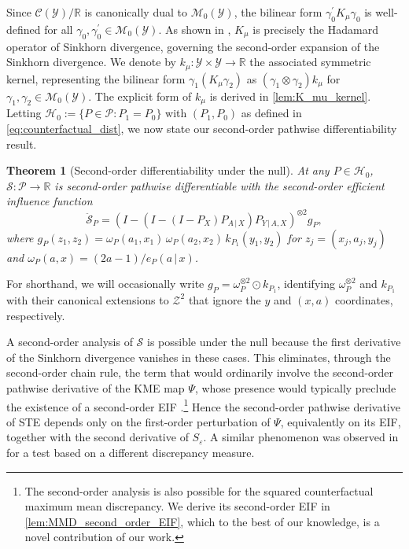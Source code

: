 \documentclass{article}
\theoremstyle{plain}
\newtheorem{theorem}{Theorem}[section]
\theoremstyle{definition}
\theoremstyle{remark}
\newcommand{\R}{\mathbb{R}}
\newcommand{\of}[1]{\left(#1\right)}
\newcommand{\cZ}{\mathcal{Z}}
\newcommand{\cP}{\mathcal{P}}
\newcommand{\cC}{\mathcal{C}}
\newcommand{\cM}{\mathcal{M}}
\newcommand{\cY}{\mathcal{Y}}
\newcommand{\ucH}{\mathscr{H}}
\newcommand{\1}{\mathbbm{1}}
\newcommand{\STE}{\mathscr{S}}
\newcommand{\eps}{\varepsilon}
\theoremstyle{plain}
\theoremstyle{definition}
\newcommand{\mymid}{\,|\,}
\begin{document}
Since $\cC(\cY) / \R$ is canonically dual to $\cM_0(\cY)$, the bilinear form $\gamma_0^\prime K_\mu \gamma_0 $ is well-defined for all $\gamma_0, \gamma_0^\prime \in \cM_0(\cY)$. As shown in \citet{kokot2025coreset}, $K_\mu$ is precisely the Hadamard operator of Sinkhorn divergence, governing the second-order expansion of the Sinkhorn divergence. We denote by $k_\mu: \cY \times \cY \to \R$ the associated symmetric kernel, representing the bilinear form $\gamma_1 (K_\mu \gamma_2)$ as $(\gamma_1 \otimes \gamma_2) k_\mu$ for $\gamma_1, \gamma_2 \in \cM_0(\cY)$. The explicit form of $k_\mu$ is derived in \cref{lem:K_mu_kernel}. Letting $\ucH_0 := \{P \in \cP: P_1 = P_0\}$ with $(P_1, P_0)$ as defined in \eqref{eq:counterfactual_dist}, we now state our second-order pathwise differentiability result.
\begin{theorem}[Second-order differentiability under the null]\label{thm:second_order_EIF}
    At any $P \in \ucH_0$, $\STE: \cP \to \R$ is second-order pathwise differentiable with the second-order efficient influence function
    \begin{equation}\label{eq:second-order-EIF}
            \ddot{\STE}_P = \of{I -  \of{ I - (I - P_X) P_{A \mymid X} } P_{Y \mymid A, X}}^{\otimes 2} g_P,
    \end{equation}
    where $g_P(z_1,z_2) = \omega_P(a_1,x_1) \, \omega_P(a_2,x_2) \, k_{P_1}(y_1,y_2)$ for $z_j=(x_j,a_j,y_j)$ and $\omega_P(a,x) = (2a-1)/e_P(a \mymid x)$.
\end{theorem}
For shorthand, we will occasionally write $g_P = \omega_P^{\otimes 2} \odot k_{P_1}$,
identifying $\omega_P^{\otimes 2}$ and $k_{P_1}$ with their canonical extensions
to $\cZ^2$ that ignore the $y$ and $(x,a)$ coordinates, respectively.

A second-order analysis of $\STE$ is possible under the null because the first derivative of the Sinkhorn divergence vanishes in these cases. This eliminates, through the second-order chain rule, the term that would ordinarily involve the second-order pathwise derivative of the KME map $\Psi$, whose presence would typically preclude the existence of a second-order EIF \citep[][pp. 681--682]{van2014higher}.\footnote{The second-order analysis is also possible for the squared counterfactual maximum mean discrepancy. We derive its second-order EIF in \cref{lem:MMD_second_order_EIF}, which to the best of our knowledge, is a novel contribution of our work.} Hence the second-order pathwise derivative of STE depends only on the first-order perturbation of $\Psi$, equivalently on its EIF, together with the second derivative of $S_\eps$. A similar phenomenon was observed in \citet{luedtke2019omnibus} for a test based on a different discrepancy measure.
\end{document}
